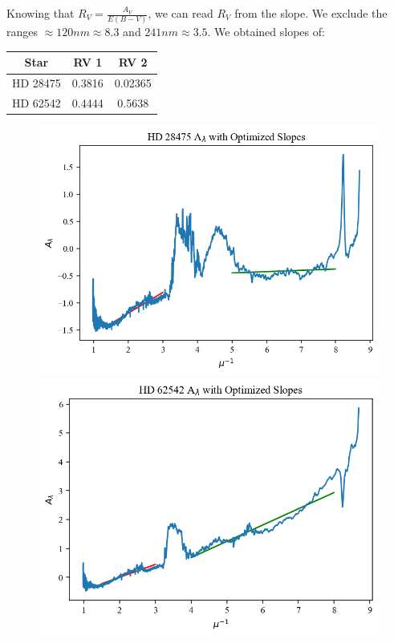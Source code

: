 \documentclass{article}
\begin{document}
    Knowing that $R_V = \tfrac{A_V}{E(B - V)}$, we can read $R_V$ from the slope. We exclude the ranges $\approx 120 nm \approx 8.3$ and $241 nm \approx 3.5$.
    We obtained slopes of:

    \begin{center}
    \begin{tabular}{| c | c | c |}
        \hline
        Star & RV 1 & RV 2 \\
        \hline
        HD 28475 & 0.3816 & 0.02365\\
        HD 62542 & 0.4444 & 0.5638 \\
        \hline
    \end{tabular}
    \end{center}

    \begin{figure}[H]
        \centering
        \includegraphics[scale = .5]{sl1.png}
        \includegraphics[scale = .5]{sl2.png}
    \end{figure}
\end{document}
